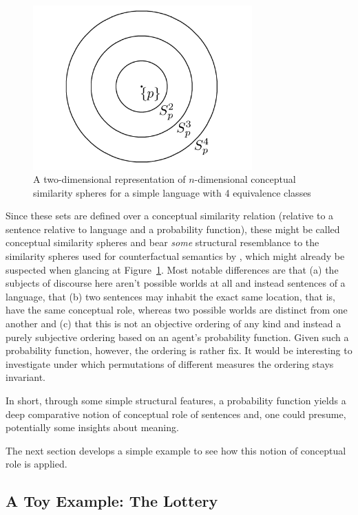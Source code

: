 \documentclass[11pt, a4paper]{scrartcl}
\renewcommand{\i}[1]{\emph{#1}}
\begin{document}
\begin{figure}
	\centering
    \includegraphics[width=0.75\textwidth]{Similarityspheres.png}
    \caption{A two-dimensional representation of $n$-dimensional conceptual similarity spheres for a simple language with 4 equivalence classes\label{fig:spheres}}
\end{figure}

Since these sets are defined over a conceptual similarity relation (relative to a sentence relative to language and a probability function), these might be called conceptual similarity spheres and bear \i{some} structural resemblance to the similarity spheres used for counterfactual semantics by \textcite{Lewis1973-LEWC-2}, which might already be suspected when glancing at Figure~\ref{fig:spheres}. Most notable differences are that (a) the subjects of discourse here aren't possible worlds at all and instead sentences of a language, that (b) two sentences may inhabit the exact same location, that is, have the same conceptual role, whereas two possible worlds are distinct from one another and (c) that this is not an objective ordering of any kind and instead a purely subjective ordering based on an agent's probability function. Given such a probability function, however, the ordering is rather fix. It would be interesting to investigate under which permutations of different measures the ordering stays invariant.

In short, through some simple structural features, a probability function yields a deep comparative notion of conceptual role of sentences and, one could presume, potentially some insights about meaning.

The next section develops a simple example to see how this notion of conceptual role is applied.

\subsection{A Toy Example: The Lottery}
\end{document}
